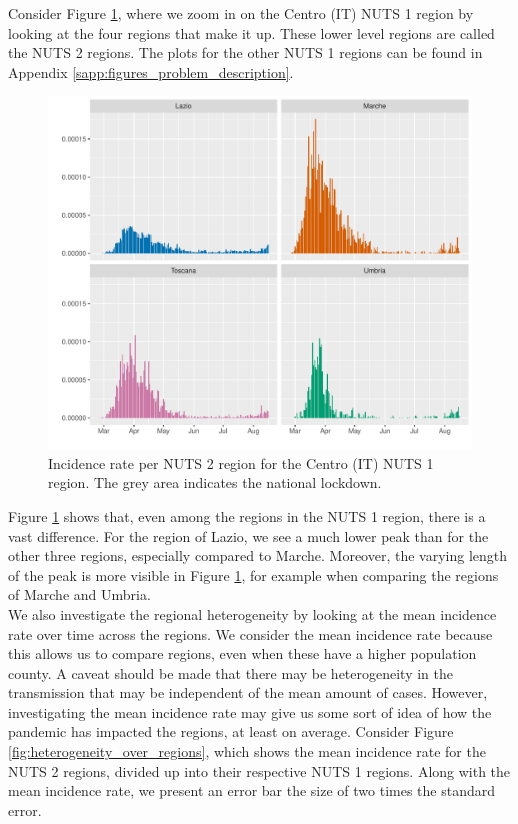 \documentclass[12pt]{article}
\begin{document}
	Consider Figure \ref{fig:incidence_Centro}, where we zoom in on the Centro (IT) NUTS 1 region by looking at the four regions that make it up. These lower level regions are called the NUTS 2 regions. The plots for the other NUTS 1 regions can be found in Appendix \ref{sapp:figures_problem_description}. 
	
	\begin{figure}[H]
	    \centering
	    \includegraphics[width=0.94\linewidth]{output/infective_rates_Centro (IT).pdf}
	    \caption{Incidence rate per NUTS 2 region for the Centro (IT) NUTS 1 region. The grey area indicates the national lockdown.}
	    \label{fig:incidence_Centro}
	\end{figure}
	
	Figure \ref{fig:incidence_Centro} shows that, even among the regions in the NUTS 1 region, there is a vast difference. For the region of Lazio, we see a much lower peak than for the other three regions, especially compared to Marche. Moreover, the varying length of the peak is more visible in Figure \ref{fig:incidence_Centro}, for example when comparing the regions of Marche and Umbria. \\
	
	We also investigate the regional heterogeneity by looking at the mean incidence rate over time across the regions. We consider the mean incidence rate because this allows us to compare regions, even when these have a higher population county. A caveat should be made that there may be heterogeneity in the transmission that may be independent of the mean amount of cases. However, investigating the mean incidence rate may give us some sort of idea of how the pandemic has impacted the regions, at least on average. Consider Figure \ref{fig:heterogeneity_over_regions}, which shows the mean incidence rate for the NUTS 2 regions, divided up into their respective NUTS 1 regions. Along with the mean incidence rate, we present an error bar the size of two times the standard error.
	
\end{document}
